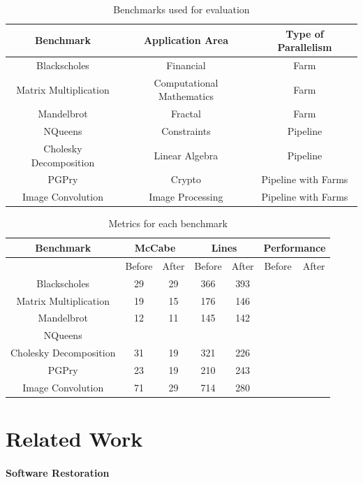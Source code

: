 \begin{table}
	\begin{tabular}{|c|c|c|}
		\hline \hline
		\textbf{Benchmark} & \textbf{Application Area} & \textbf{Type of Parallelism} \\
		\hline
		Blackscholes & Financial & Farm \\
		Matrix Multiplication & Computational Mathematics & Farm \\
		Mandelbrot & Fractal & Farm \\
		NQueens & Constraints & Pipeline \\
		Cholesky Decomposition & Linear Algebra & Pipeline \\
		PGPry & Crypto & Pipeline with Farms \\
		Image Convolution & Image Processing & Pipeline with Farms \\
		\hline \hline
	\end{tabular}
	\caption{Benchmarks used for evaluation}
	\label{fig:benchmarks}
\end{table}

\begin{table}
	\begin{tabular}{|c|c|c|c|c|c|c|}
		\hline \hline
		\textbf{Benchmark} & \multicolumn{2}{|c|}{McCabe} & \multicolumn{2}{|c|}{Lines} & \multicolumn{2}{|c|}{Performance}  \\
		\hline
		& Before & After & Before & After & Before & After  \\
		\hline
		Blackscholes &  29 & 29 & 366 & 393 & &   \\
		Matrix Multiplication & 19 & 15 & 176 & 146 & &  \\
		Mandelbrot & 12 & 11 & 145 & 142 & & \\
		NQueens &  & & & & &  \\
		Cholesky Decomposition & 31  & 19 & 321 & 226 & &  \\
		PGPry & 23 & 19 & 210 & 243 & & \\
		Image Convolution & 71 & 29 & 714 & 280 & & \\
		\hline \hline
	\end{tabular}
	\caption{Metrics for each benchmark}
	\label{fig:benchmarks}
\end{table}

\section{Related Work}

\paragraph{Software Restoration}

